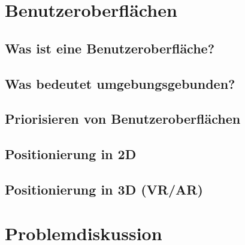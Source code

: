 \documentclass[a5paper]{scrartcl}
\begin{document}
	\maketitle %
	
	\tableofcontents %
	\newpage %
	\setcounter{page}{1}
	\newpage %
	\section{Benutzeroberflächen}
	
	\subsection{Was ist eine Benutzeroberfläche?}
	
	\subsection{Was bedeutet umgebungsgebunden?}
	
	\subsection{Priorisieren von Benutzeroberflächen}
	
	\subsection{Positionierung in 2D}
	
	\subsection{Positionierung in 3D (VR/AR)}
	
	\section{Problemdiskussion}
	
	
	
\end{document}
